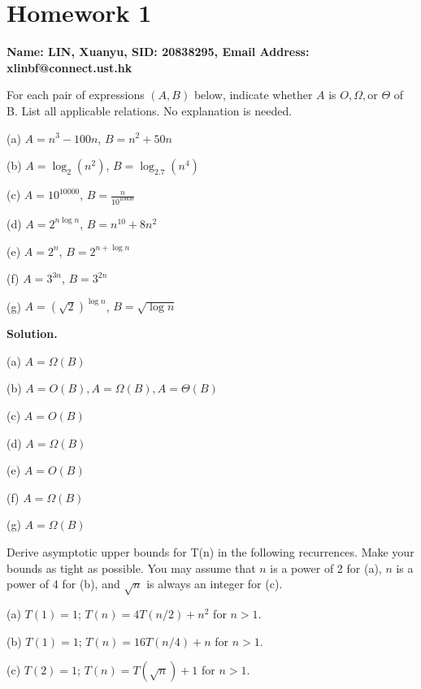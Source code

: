 \documentclass[10pt]{article}
\begin{document}
\section*{Homework 1}

\textbf{Name: LIN, Xuanyu, SID: 20838295, Email Address: xlinbf@connect.ust.hk}

\begin{Problem}
	
	For each pair of expressions $(A, B)$ below, indicate whether $A$
	is $O, \Omega, \text{or } \Theta$ of B. List all applicable relations. No explanation is needed.
	
	\noindent (a) $A = n^3-100n$, $B = n^2+50n$
	
	\noindent (b) $A = \log_2(n^2)$, $B = \log_{2.7}(n^4)$
	
	\noindent (c) $A = 10^{10000}$, $B = \frac{n}{10^{10000}}$
	
	\noindent (d) $A = 2^{n\log n}$, $B = n^{10}+8n^2$
	
	\noindent (e) $A = 2^n$, $B = 2^{n+\log n}$
	
	\noindent (f) $A = 3^{3n}$, $B = 3^{2n}$
	
	\noindent (g) $A = (\sqrt{2})^{\log n}$, $B = \sqrt{\log n}$
	
\end{Problem}

\textbf{Solution.}
	
	(a) $A = \Omega(B)$
	
	(b) $A = O(B), A = \Omega(B), A = \Theta(B)$
	
	(c) $A = O(B)$
	
	(d) $A = \Omega(B)$
	
	(e) $A = O(B)$
	
	(f) $A = \Omega(B)$
	
	(g) $A = \Omega(B)$

\newpage

\begin{Problem}
	
	Derive asymptotic upper bounds for T(n) in the following recurrences. Make your bounds as tight as possible. You may assume that $n$ is a power of 2 for (a), $n$ is a power of 4 for (b), and $\sqrt{n}$ is always an integer for (c).
	
	\noindent (a) $T(1) = 1$; $T(n) = 4T(n/2) + n^2$ for $n>1$.
	
	\noindent (b) $T(1) = 1$; $T(n) = 16T(n/4) + n$ for $n>1$.
	
	\noindent (c) $T(2) = 1$; $T(n) = T(\sqrt{n}) + 1$ for $n>1$.
	
\end{Problem}
\end{document}
